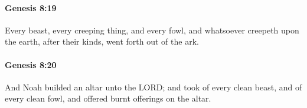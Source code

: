 		\paragraph{Genesis 8:19} %
			\label{GENESIS-8-19}

			Every beast, every creeping thing, and every fowl, and whatsoever creepeth upon the earth, after their kinds, went forth out of the ark.


		\paragraph{Genesis 8:20} %
			\label{GENESIS-8-20}

			And Noah builded an altar unto the LORD; and took of every clean beast, and of every clean fowl, and offered burnt offerings on the altar.


